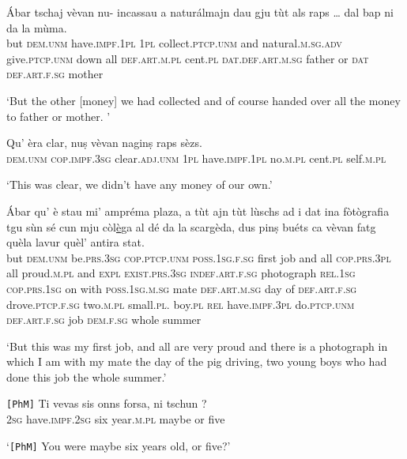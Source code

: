 \begin{linenumbers}
	\gll    Ábar tschaj vèvan nu- incassau a naturálmajn dau gju tùt als raps … dal bap ni da la mùma.\\
	but \textsc{dem.unm} have.\textsc{impf.1pl} \textsc{1pl} collect.\textsc{ptcp.unm} and natural.\textsc{m.sg.adv}  give.\textsc{ptcp.unm} down all \textsc{def.art.m.pl} cent.\textsc{pl} {} \textsc{dat.def.art.m.sg} father or  \textsc{dat}  \textsc{def.art.f.sg} mother \\
\end{linenumbers}
\medskip
\glt `But the other [money] we had collected and of course handed over all the money to father or mother. '
\medskip

\begin{linenumbers}
	\gll    Qu’ èra clar, nuṣ vèvan naginṣ raps sèzs.\\
	\textsc{dem.unm} \textsc{cop.impf.3sg} clear.\textsc{adj.unm} \textsc{1pl} have.\textsc{impf.1pl}  no.\textsc{m.pl} cent.\textsc{pl} self.\textsc{m.pl}\\
\end{linenumbers}
\medskip
\glt `This was clear, we didn’t have any money of our own.'
\medskip


\begin{linenumbers}
	\gll    Ábar qu’ è stau mi’ ampréma plaza, a tùt ajn tùt lùschs ad i dat ina fòtògrafia tgu sùn sé cun mju còl\underline{è}ga al dé da la scargèda, dus pinṣ buéts ca vèvan fatg quèla lavur quèl’ antira stat.\\
	but \textsc{dem.unm} be.\textsc{prs.3sg} \textsc{cop.ptcp.unm}  \textsc{poss.1sg.f.sg} first job and all \textsc{cop.prs.3pl} all proud.\textsc{m.pl} and  \textsc{expl} \textsc{exist.prs.3sg}  \textsc{indef.art.f.sg} photograph \textsc{rel.1sg}  \textsc{cop.prs.1sg} on with \textsc{poss.1sg.m.sg} mate \textsc{def.art.m.sg} day of  \textsc{def.art.f.sg}  drove.\textsc{ptcp.f.sg} two.\textsc{m.pl} small.\textsc{pl.} boy.\textsc{pl} \textsc{rel} have.\textsc{impf.3pl} do.\textsc{ptcp.unm} \textsc{def.art.f.sg} job \textsc{dem.f.sg} whole summer\\
\end{linenumbers}
\medskip
\glt `But this was my first job, and all are very proud and there is a photograph in which I am with my mate the day of the pig driving, two young boys who had done this job the whole summer.'
\medskip

\begin{linenumbers}
	\gll  \texttt{[PhM]} Ti vevas sis onns forsa, ni tschun ?\\
{}	\textsc{2sg} have.\textsc{impf.2sg} six year.\textsc{m.pl} maybe or five \\
\end{linenumbers}
\medskip
\glt `\texttt{[PhM]} You were maybe six years old, or five?'
\medskip

